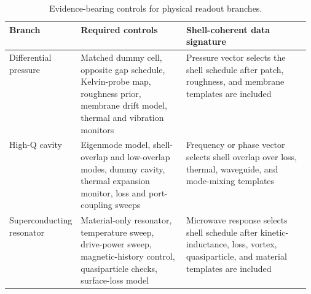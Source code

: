 \documentclass[11pt]{article}
\begin{document}
\begin{table}[htbp]
\centering
\caption{Evidence-bearing controls for physical readout branches.}
\label{tab:controls}
\small
\begin{tabularx}{\linewidth}{>{\raggedright\arraybackslash}p{0.22\linewidth}
>{\raggedright\arraybackslash}p{0.35\linewidth}
>{\raggedright\arraybackslash}X}
\toprule
Branch & Required controls & Shell-coherent data signature \\
\midrule
Differential pressure & Matched dummy cell, opposite gap schedule, Kelvin-probe map, roughness prior, membrane drift model, thermal and vibration monitors & Pressure vector selects the shell schedule after patch, roughness, and membrane templates are included \\
High-Q cavity & Eigenmode model, shell-overlap and low-overlap modes, dummy cavity, thermal expansion monitor, loss and port-coupling sweeps & Frequency or phase vector selects shell overlap over loss, thermal, waveguide, and mode-mixing templates \\
Superconducting resonator & Material-only resonator, temperature sweep, drive-power sweep, magnetic-history control, quasiparticle checks, surface-loss model & Microwave response selects shell schedule after kinetic-inductance, loss, vortex, quasiparticle, and material templates are included \\
\bottomrule
\end{tabularx}
\end{table}
\end{document}
